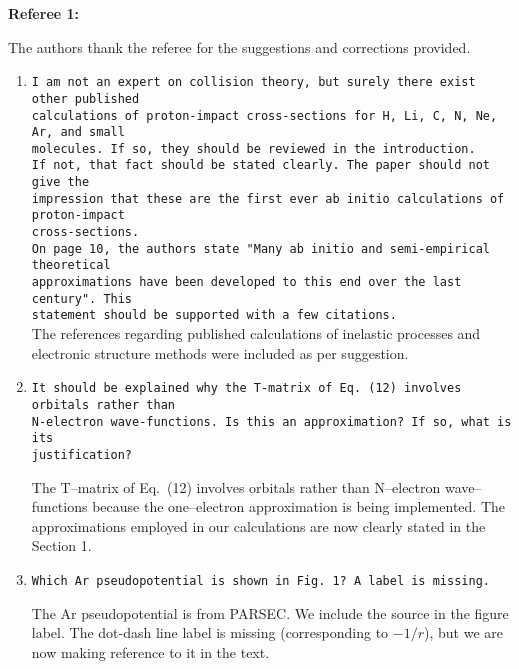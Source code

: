 \documentclass[10pt]{article}
\begin{document}
\noindent
{\bf Referee 1:}

\vspace{0.2cm}
The authors thank the referee for the suggestions and corrections provided.

\begin{enumerate}
 \item 
 {\tt I am not an expert on collision theory, but surely there exist 
 other published \\ calculations of proton-impact cross-sections for 
 H, Li, C, N, Ne, Ar, and small \\ molecules. If so, they should be 
 reviewed in the introduction. \\ If not, that fact should be stated 
 clearly. The paper should not give the \\ impression that these are the 
 first ever ab initio calculations of proton-impact \\ cross-sections.} \\
 {\tt On page 10, the authors state "Many ab initio and semi-empirical 
 theoretical \\ approximations have been developed to this end over 
 the last century". This \\ statement should be supported with a few 
 citations.} \\
 
 \vspace{-0.25cm}
 The references regarding published calculations of inelastic 
 processes and electronic structure methods were included as per 
 suggestion.
 
 \item {\tt It should be explained why the T-matrix of Eq.~(12) 
 involves orbitals rather than \\  N-electron wave-functions. Is this 
 an approximation? If so, what is its \\ justification?}
 
 The T--matrix of Eq.~(12) involves orbitals rather than N--electron 
 wave--functions because the 
 one--electron approximation is being implemented. The approximations
 employed in our calculations are now clearly stated in the Section 1. 
 
 \item {\tt Which Ar pseudopotential is shown in Fig.~1? A label is 
 missing.}
 
 The Ar pseudopotential is from PARSEC. We include the source in the 
 figure label. The dot-dash line label is missing (corresponding to
 $-1/r$), but we are now making reference to it in the text. 
 

\end{enumerate}
\end{document}
